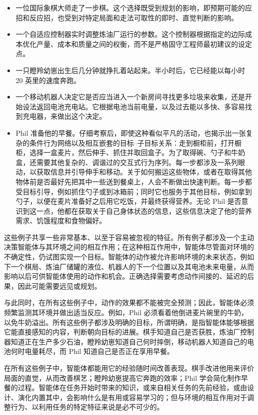 \documentclass[UTF8,12pt,a4paper,fontset=fandol]{ctexart}
\begin{document}
\begin{itemize}
\item 一位国际象棋大师走了一步棋。这个选择既受到规划的影响，即预期可能的应招和反应招，也受到对特定局面和走法可取性的即时、直觉判断的影响。

\item 一个自适应控制器实时调整炼油厂运行的参数。这个控制器根据指定的边际成本优化产量、成本和质量之间的权衡，而不是严格固守工程师最初建议的设定点。

\item 一只瞪羚幼崽出生后几分钟就挣扎着站起来。半小时后，它已经能以每小时 20 英里的速度奔跑。

\item 一个移动机器人决定它是否应当进入一个新房间寻找更多垃圾来收集，还是开始设法返回电池充电站。它根据电池当前电量，以及过去能以多快、多容易找到充电器，来做出这个决定。

\item Phil 准备他的早餐。仔细考察后，即使这种看似平凡的活动，也揭示出一张复杂的条件行为网络以及相互嵌套的目标--子目标关系：走到橱柜前，打开橱柜，选择一盒麦片，然后伸手、抓住并取回盒子。为了取得碗、勺子和牛奶盒，还需要其他复杂的、调谐过的交互式行为序列。每一步都涉及一系列眼动，以获取信息并引导伸手和移动。关于如何搬运这些物体，或者在取得其他物体前是否最好先把其中一些送到餐桌上，人会不断做出快速判断。每一步都受目标引导，例如抓住勺子或到冰箱前；同时它也服务于其他目标，例如拿到勺子，以便在麦片准备好之后用它吃饭，并最终获得营养。无论 Phil 是否意识到这一点，他都在获取关于自己身体状态的信息，这些信息决定了他的营养需求、饥饿程度和食物偏好。
\end{itemize}

这些例子共享一些非常基本、以至于容易被忽视的特征。所有例子都涉及一个主动决策智能体与其环境之间的相互作用；在这种相互作用中，智能体尽管面对环境的不确定性，仍试图实现一个目标。智能体的动作被允许影响环境的未来状态，例如下一个棋局、炼油厂储罐的液位、机器人的下一个位置以及其电池未来电量，从而影响以后可供智能体使用的动作和机会。正确选择需要考虑动作间接的、延迟的后果，因此可能需要远见或规划。

与此同时，在所有这些例子中，动作的效果都不能被完全预测；因此，智能体必须频繁监测其环境并做出适当反应。例如，Phil 必须看着他倒进麦片碗里的牛奶，以免牛奶溢出。所有这些例子都涉及明确的目标，所谓明确，是指智能体能够根据它能直接感知的内容，判断朝向目标的进展。棋手知道自己是否获胜，炼油厂控制器知道正在生产多少石油，瞪羚幼崽知道自己何时摔倒，移动机器人知道自己的电池何时电量耗尽，而 Phil 知道自己是否正在享用早餐。

在所有这些例子中，智能体都能用它的经验随时间改善表现。棋手改进他用来评价局面的直觉，从而改善棋艺；瞪羚幼崽提高它奔跑的效率；Phil 学会简化制作早餐的过程。智能体在任务开始时带来的知识，或来自相关任务的先前经验，或由设计、演化内置其中，会影响什么是有用或容易学习的；但与环境的相互作用对于调整行为、以利用任务的特定特征来说是必不可少的。
\end{document}
